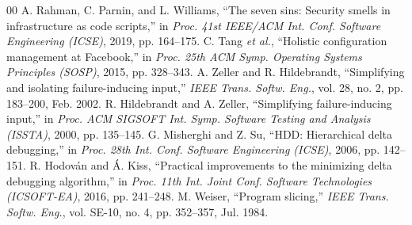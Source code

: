 \documentclass[conference]{IEEEtran}
\begin{document}
\begin{thebibliography}{00}
 A. Rahman, C. Parnin, and L. Williams, ``The seven sins: Security smells in infrastructure as code scripts,'' in \emph{Proc. 41st IEEE/ACM Int. Conf. Software Engineering (ICSE)}, 2019, pp. 164--175.
 C. Tang \emph{et al.}, ``Holistic configuration management at Facebook,'' in \emph{Proc. 25th ACM Symp. Operating Systems Principles (SOSP)}, 2015, pp. 328--343.
 A. Zeller and R. Hildebrandt, ``Simplifying and isolating failure-inducing input,'' \emph{IEEE Trans. Softw. Eng.}, vol. 28, no. 2, pp. 183--200, Feb. 2002.
 R. Hildebrandt and A. Zeller, ``Simplifying failure-inducing input,'' in \emph{Proc. ACM SIGSOFT Int. Symp. Software Testing and Analysis (ISSTA)}, 2000, pp. 135--145.
 G. Misherghi and Z. Su, ``HDD: Hierarchical delta debugging,'' in \emph{Proc. 28th Int. Conf. Software Engineering (ICSE)}, 2006, pp. 142--151.
 R. Hodov\'{a}n and \'{A}. Kiss, ``Practical improvements to the minimizing delta debugging algorithm,'' in \emph{Proc. 11th Int. Joint Conf. Software Technologies (ICSOFT-EA)}, 2016, pp. 241--248.
 M. Weiser, ``Program slicing,'' \emph{IEEE Trans. Softw. Eng.}, vol. SE-10, no. 4, pp. 352--357, Jul. 1984.
\end{thebibliography}
\end{document}

